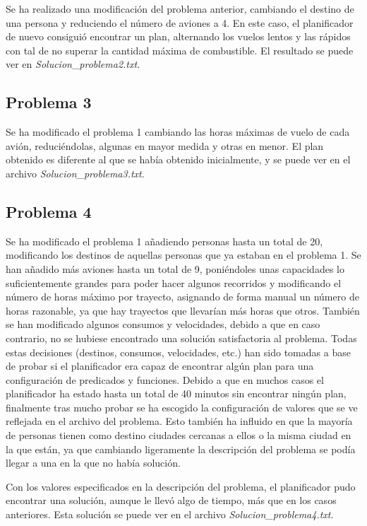 \documentclass[11pt,a4paper]{article}
\begin{document}
Se ha realizado una modificación del problema anterior, cambiando el destino de una persona y reduciendo el número de aviones
a 4. En este caso, el planificador de nuevo consiguió encontrar un plan, alternando los vuelos lentos y las rápidos con tal de
no superar la cantidad máxima de combustible. El resultado se puede ver en \textit{Solucion\_problema2.txt}.

\subsection{Problema 3}

Se ha modificado el problema 1 cambiando las horas máximas de vuelo de cada avión, reduciéndolas, algunas en mayor medida y otras
en menor. El plan obtenido es diferente al que se había obtenido inicialmente, y se puede ver en el archivo \textit{Solucion\_problema3.txt}.

\subsection{Problema 4}

Se ha modificado el problema 1 añadiendo personas hasta un total de 20, modificando los destinos de aquellas personas que ya estaban
en el problema 1. Se han añadido más aviones hasta un total de 9, poniéndoles unas capacidades lo suficientemente grandes para poder
hacer algunos recorridos y modificando el número de horas máximo por trayecto, asignando de forma manual un número de horas razonable,
ya que hay trayectos que llevarían más horas que otros. También se han modificado algunos consumos y velocidades, debido a que en
caso contrario, no se hubiese encontrado una solución satisfactoria al problema. Todas estas decisiones (destinos, consumos,
velocidades, etc.) han sido tomadas a base de probar si el planificador era capaz de encontrar algún plan para una configuración
de predicados y funciones. Debido a que en muchos casos el planificador ha estado hasta un total de 40 minutos sin encontrar ningún
plan, finalmente tras mucho probar se ha escogido la configuración de valores que se ve reflejada en el archivo del problema. Esto
también ha influido en que la mayoría de personas tienen como destino ciudades cercanas a ellos o la misma ciudad en la que están,
ya que cambiando ligeramente la descripción del problema se podía llegar a una en la que no había solución.

Con los valores especificados en la descripción del problema, el planificador pudo encontrar una solución, aunque le llevó algo de
tiempo, más que en los casos anteriores. Esta solución se puede ver en el archivo \textit{Solucion\_problema4.txt}.
\end{document}
